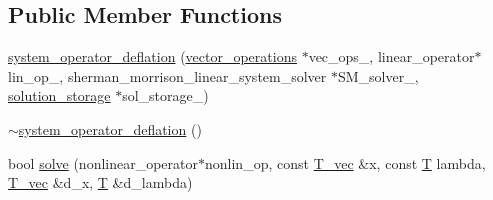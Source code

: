 \subsection*{Public Member Functions}
\begin{DoxyCompactItemize}
\item 
\hyperlink{classdeflation_1_1system__operator__deflation_a7af35084cc9d1f839a96a002899dfd58}{system\-\_\-operator\-\_\-deflation} (\hyperlink{container__test_8cpp_aca3cc0310428d338f3a165c7823d6499}{vector\-\_\-operations} $\ast$vec\-\_\-ops\-\_\-, linear\-\_\-operator$\ast$lin\-\_\-op\-\_\-, sherman\-\_\-morrison\-\_\-linear\-\_\-system\-\_\-solver $\ast$S\-M\-\_\-solver\-\_\-, \hyperlink{classdeflation_1_1solution__storage}{solution\-\_\-storage} $\ast$sol\-\_\-storage\-\_\-)
\item 
\hyperlink{classdeflation_1_1system__operator__deflation_a1e7ce2672a992d30eb6132917d796f51}{$\sim$system\-\_\-operator\-\_\-deflation} ()
\item 
bool \hyperlink{classdeflation_1_1system__operator__deflation_aae79ccde9c028f86471180deb6ef5e6f}{solve} (nonlinear\-\_\-operator$\ast$nonlin\-\_\-op, const \hyperlink{classdeflation_1_1system__operator__deflation_a049936d7a4abda90adcccdc8ff56e186}{T\-\_\-vec} \&x, const \hyperlink{classdeflation_1_1system__operator__deflation_ac9c012537cdfa0be8c8ebda025dd71ba}{T} lambda, \hyperlink{classdeflation_1_1system__operator__deflation_a049936d7a4abda90adcccdc8ff56e186}{T\-\_\-vec} \&d\-\_\-x, \hyperlink{classdeflation_1_1system__operator__deflation_ac9c012537cdfa0be8c8ebda025dd71ba}{T} \&d\-\_\-lambda)
\end{DoxyCompactItemize}


